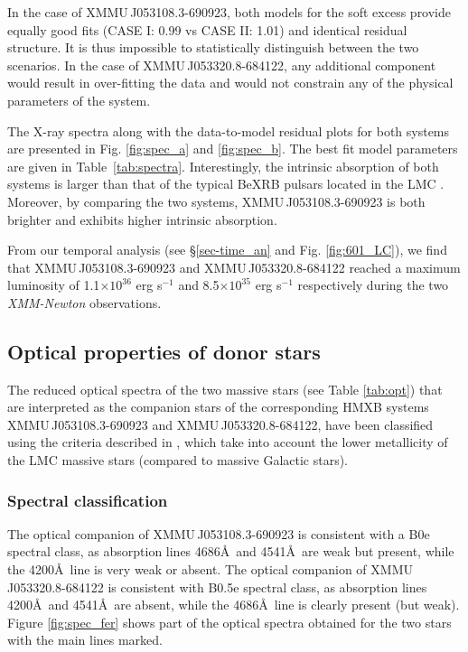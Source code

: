 \documentclass[a4paper,fleqn,usenatbib]{mnras}
\newcommand{\ergs}[1]{$\times 10^{#1}$ erg s$^{-1}$}
\newcommand{\xmm}{{\it XMM-Newton}\xspace}
\newcommand{\canda}{XMMU\,J053108.3-690923\xspace} %
\newcommand{\candb}{XMMU\,J053320.8-684122\xspace} %
\begin{document}
In the case of  \canda, both models for the soft excess provide equally good fits (CASE I: 0.99 vs CASE II: 1.01) and identical residual structure. It  is thus impossible to statistically distinguish between the two scenarios. In the case of \candb, any additional component would result in over-fitting the data and would not constrain any of the physical parameters of the system.

The X-ray spectra along with the data-to-model residual plots for both systems are presented in Fig. \ref{fig:spec_a} and \ref{fig:spec_b}.
The best fit model parameters are given in Table~\ref{tab:spectra}.
Interestingly, the intrinsic absorption of both systems is larger than that of the typical BeXRB pulsars located in the LMC \citep[e.g.][]{2014A&A...567A.129V,2016MNRAS.461.1875V,2017A&A...598A..69H}.
Moreover, by comparing the two systems, \canda is both brighter and exhibits higher intrinsic absorption.
  
From our temporal analysis (see \S\ref{sec-time_an} and Fig. \ref{fig:601_LC}), we find that \canda and \candb reached a maximum luminosity of 1.1\ergs{36} and 8.5\ergs{35} respectively during the two \xmm observations.

\subsection{Optical properties of donor stars}
\label{sec:feros}

The reduced optical spectra of the two massive stars (see Table \ref{tab:opt}) that are interpreted as the companion stars of the corresponding HMXB systems \canda and \candb, have been classified using the criteria described in \citet{2004MNRAS.353..601E,2015A&A...584A...5E}, which take into account the lower metallicity of the LMC massive stars (compared to massive Galactic stars).

\subsubsection{Spectral classification}
The optical companion of \canda is consistent with a B0e spectral class, as absorption lines  4686\AA~and 4541\AA~are weak but present, while the  4200\AA~line is very weak or absent.
The optical companion of \candb is consistent with B0.5e spectral class,  as absorption lines  4200\AA~and 4541\AA~are absent, while the  4686\AA~line is clearly present (but weak).
Figure \ref{fig:spec_fer} shows part of the optical spectra obtained for the two stars with the main lines marked.
\end{document}
